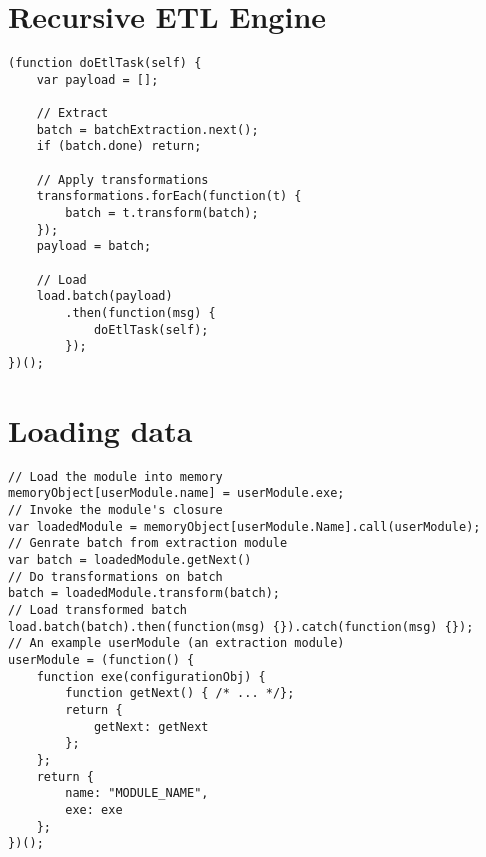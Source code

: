 \section{Recursive ETL Engine}
\label{appendix:netl-engine}
\begin{verbatim}
(function doEtlTask(self) {
    var payload = [];

    // Extract
    batch = batchExtraction.next();
    if (batch.done) return;

    // Apply transformations
    transformations.forEach(function(t) {
        batch = t.transform(batch);
    });
    payload = batch;

    // Load
    load.batch(payload)
        .then(function(msg) {
            doEtlTask(self);
        });
})();
\end{verbatim}

\section{Loading data}
\label{appendix:netl-loading}
\begin{verbatim}
// Load the module into memory
memoryObject[userModule.name] = userModule.exe;
// Invoke the module's closure
var loadedModule = memoryObject[userModule.Name].call(userModule);
// Genrate batch from extraction module
var batch = loadedModule.getNext()
// Do transformations on batch
batch = loadedModule.transform(batch);
// Load transformed batch
load.batch(batch).then(function(msg) {}).catch(function(msg) {});
// An example userModule (an extraction module)
userModule = (function() {
    function exe(configurationObj) {
        function getNext() { /* ... */};
        return {
            getNext: getNext
        };
    };
    return {
        name: "MODULE_NAME",
        exe: exe
    };
})();
\end{verbatim}